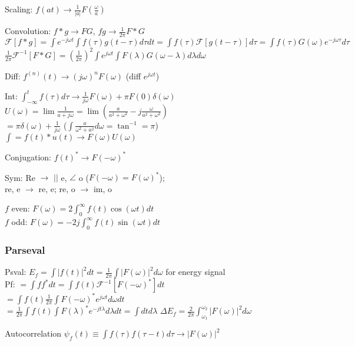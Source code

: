 \documentclass[4pt]{article}
\theoremstyle{definition}
\theoremstyle{definition}
\renewcommand{\o}{\omega}
\newcommand{\ra}{\rightarrow}
\begin{document}
\begin{multicols}{3}
    Scaling: \(f(at)\ra \frac{1}{|a|}F(\frac{\o}{a})\)   %

    Convolution: \(f*g \ra FG\), \(fg \ra \frac{1}{2\pi} F*G\)\\
    \(\mathcal F[f*g] = \int e^{-j\o t} \int f(\tau) g(t-\tau)d\tau dt =\int f(\tau) \mathcal F[g(t-\tau)]  d\tau = \int f(\tau) G(\o)e^{-j\o\tau}d\tau\)\\
    \( \frac{1}{2\pi} \mathcal{F}^{-1}[F * G] = (\frac{1}{2\pi})^2 \int e^{j\o t} \int F(\lambda) G(\o - \lambda) d\lambda d\o\)

    Diff: \(f^{(n)}(t) \ra (j\o)^nF(\o)\) (diff $e^{j\o t}$)    %
    
    Int: \(\int_{-\infty}^t f(\tau)d\tau \ra \frac{1}{j\o}F(\o) + \pi F(0) \delta(\o)\)\\
    \(U(\o) = \lim \frac{1}{a+j\o} = \lim (\frac{a}{a^2+\o^2} - j\frac{\o}{a^2+\o^2}) \) \\
    \(= \pi\delta(\o) + \frac{1}{j\o}\) ($\int \frac{a}{\o^2+a^2}d\o = \tan^{-1}=\pi$)\\
    $\int = f(t) * u(t) \ra F(\o)U(\o)$

    Conjugation: \(f(t)^* \ra F(-\o)^*\)   %

    Sym: Re $\ra$ $||$ e, $\angle$ o ($F(-\o) = F(\o)^*$);\\
    re, e $\ra$ re, e; re, o $\ra$ im, o

    $f$ even: \(F(\o) = 2\int_0^{\infty} f(t)\cos(\o t) dt\)\\
    $f$ odd: \(F(\o) = -2j\int_0^{\infty} f(t) \sin(\o t) dt\)

\subsubsection{Parseval}
    Psval: \(E_f = \int |f(t)|^2 dt = \frac{1}{2\pi} \int |F(\omega)|^2 d\o\)  for energy signal\\  %
    Pf: \(= \int f f^* dt = \int f(t)\mathcal F ^{-1}[F(-\o)^*]dt\)\\
    \(= \int f(t) \frac{1}{2\pi} \int F(-\o)^* e^{j\o t} d\o dt\)\\
    \(= \frac{1}{2\pi}\int f(t) \int F(\lambda)^* e^{-jt\lambda} d\lambda dt = \int dt d\lambda\)
    \(\Delta E_f = \frac{2}{2\pi}\int^{\o_2}_{\o_1} |F(\o)|^2 d\o\) %

    Autocorrelation \(\psi_f(t) \equiv \int f(\tau)f(\tau-t)d\tau \ra |F(\o)|^2\)   %

\end{multicols}
\end{document}
